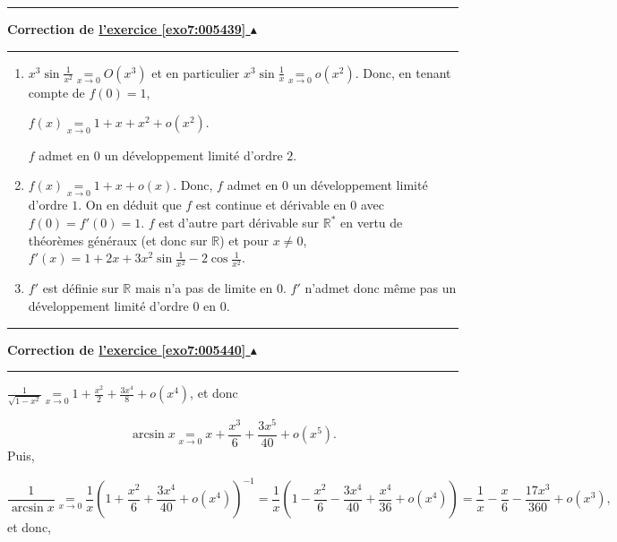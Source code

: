 \documentclass[11pt,a4paper]{article}
\newcommand{\Rr}{\mathbb{R}} \newcommand{\R}{\mathbb{R}}
\newcommand{\Arcsin}{\mathop{\mathrm{arcsin}}\nolimits}
\newcounter{exo}
\newcommand{\correction}[1]{\hypertarget{cor7:#1}{}\label{cor7:#1}{\bf Correction de \hyperlink{exo7:#1}{l'exercice \ref{exo7:#1} $\blacktriangle$}}\vspace{1mm}\hrule\vspace{1mm}}
\newcommand{\fincorrection}{\vspace{1mm}\hrule\vspace*{7mm}}
\begin{document}
\fincorrection
\correction{005439}
\begin{enumerate}
 \item  $x^3\sin\frac{1}{x^2}\underset{x\rightarrow0}{=}O(x^3)$ et en particulier $x^3\sin\frac{1}{x}\underset{x\rightarrow0}{=}o(x^2)$. Donc, en tenant compte de $f(0)=1$,

\begin{center}
$f(x)\underset{x\rightarrow0}{=}1+x+x^2+o(x^2)$.
\end{center}
$f$ admet en $0$ un développement limité d'ordre $2$.
 \item  $f(x)\underset{x\rightarrow0}{=}1+x+o(x)$. Donc, $f$ admet en $0$ un développement limité d'ordre $1$. On en déduit que $f$ est continue et dérivable en $0$ avec $f(0)=f'(0)=1$. $f$ est d'autre part dérivable sur $\Rr^*$ en vertu de théorèmes généraux (et donc sur $\Rr$) et pour $x\neq 0$, $f'(x)=1+2x+3x^2\sin\frac{1}{x^2}-2\cos\frac{1}{x^2}$.
 \item  $f'$ est définie sur $\Rr$ mais n'a pas de limite en $0$. $f'$ n'admet donc même pas un développement limité d'ordre $0$ en $0$.
\end{enumerate}
\fincorrection
\correction{005440}
$\frac{1}{\sqrt{1-x^2}}\underset{x\rightarrow0}{=}1+\frac{x^2}{2}+\frac{3x^4}{8}+o(x^4)$, et donc 

$$\Arcsin x\underset{x\rightarrow0}{=}x+\frac{x^3}{6}+\frac{3x^5}{40}+o(x^5).$$
Puis,

$$\frac{1}{\Arcsin x}\underset{x\rightarrow0}{=}\frac{1}{x}\left(1+\frac{x^2}{6}+\frac{3x^4}{40}+o(x^4)\right)^{-1}=\frac{1}{x}\left(1-\frac{x^2}{6}-\frac{3x^4}{40}+\frac{x^4}{36}+o(x^4)\right)=\frac{1}{x}-\frac{x}{6}-\frac{17x^3}{360}+o(x^3),$$
et donc,
\end{document}
